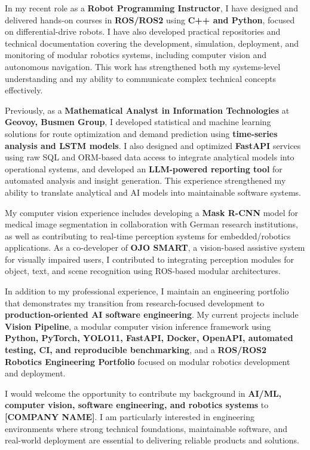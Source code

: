 \documentclass[letterpaper,10pt]{article}
\newcommand{\CompanyName}{[COMPANY NAME]} %
\begin{document}
\quad\newline
In my recent role as a \textbf{Robot Programming Instructor}, I have designed and delivered hands-on courses in \textbf{ROS/ROS2} using \textbf{C++ and Python}, focused on differential-drive robots. I have also developed practical repositories and technical documentation covering the development, simulation, deployment, and monitoring of modular robotics systems, including computer vision and autonomous navigation. This work has strengthened both my systems-level understanding and my ability to communicate complex technical concepts effectively.

\quad\newline
Previously, as a \textbf{Mathematical Analyst in Information Technologies} at \textbf{Geovoy, Busmen Group}, I developed statistical and machine learning solutions for route optimization and demand prediction using \textbf{time-series analysis and LSTM models}. I also designed and optimized \textbf{FastAPI} services using raw SQL and ORM-based data access to integrate analytical models into operational systems, and developed an \textbf{LLM-powered reporting tool} for automated analysis and insight generation. This experience strengthened my ability to translate analytical and AI models into maintainable software systems.

\quad\newline
My computer vision experience includes developing a \textbf{Mask R-CNN} model for medical image segmentation in collaboration with German research institutions, as well as contributing to real-time perception systems for embedded/robotics applications. As a co-developer of \textbf{OJO SMART}, a vision-based assistive system for visually impaired users, I contributed to integrating perception modules for object, text, and scene recognition using ROS-based modular architectures.

\quad\newline
In addition to my professional experience, I maintain an engineering portfolio that demonstrates my transition from research-focused development to \textbf{production-oriented AI software engineering}. My current projects include \textbf{Vision Pipeline}, a modular computer vision inference framework using \textbf{Python, PyTorch, YOLO11, FastAPI, Docker, OpenAPI, automated testing, CI, and reproducible benchmarking}, and a \textbf{ROS/ROS2 Robotics Engineering Portfolio} focused on modular robotics development and deployment.

\quad\newline
I would welcome the opportunity to contribute my background in \textbf{AI/ML, computer vision, software engineering, and robotics systems} to \textbf{\CompanyName}. I am particularly interested in engineering environments where strong technical foundations, maintainable software, and real-world deployment are essential to delivering reliable products and solutions.
\end{document}
